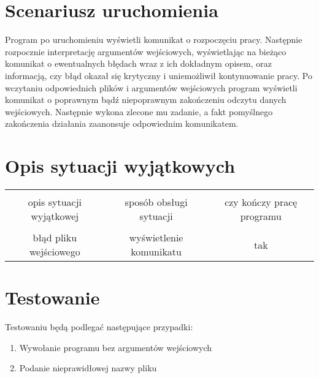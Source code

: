 \documentclass{article}
\begin{document}
\section{Scenariusz uruchomienia}
Program po uruchomieniu wyświetli komunikat o rozpoczęciu pracy. Następnie rozpocznie interpretację argumentów wejściowych, wyświetlając na bieżąco komunikat o ewentualnych błędach wraz z ich dokładnym opisem, oraz informacją, czy błąd okazał się krytyczny i uniemożliwił kontynuowanie pracy. Po wczytaniu odpowiednich plików i argumentów wejściowych program wyświetli komunikat o poprawnym bądź niepoprawnym zakończeniu odczytu danych wejściowych. Następnie wykona zlecone mu zadanie, a fakt pomyślnego zakończenia działania zaanonsuje odpowiednim komunikatem.
\section{Opis sytuacji wyjątkowych}
\begin{tabular}{|c|c|c|} \hline
& & \\
opis sytuacji wyjątkowej & sposób obsługi sytuacji & czy kończy pracę programu \\ 
& & \\ \hline
błąd pliku wejściowego & wyświetlenie komunikatu & tak\\ \hline
\end{tabular}
\section{Testowanie}
Testowaniu będą podlegać następujące przypadki:
\begin{enumerate}
    \item Wywołanie programu bez argumentów wejściowych
    \item Podanie nieprawidłowej nazwy pliku
\end{enumerate}
\end{document}
